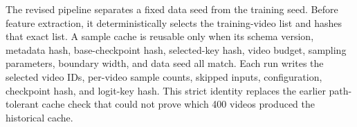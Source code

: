 The revised pipeline separates a fixed data seed from the training seed.
Before feature extraction, it deterministically selects the training-video
list and hashes that exact list. A sample cache is reusable only when its schema
version, metadata hash, base-checkpoint hash, selected-key hash, video budget,
sampling parameters, boundary width, and data seed all match. Each run writes
the selected video IDs, per-video sample counts, skipped inputs, configuration,
checkpoint hash, and logit-key hash. This strict identity replaces the earlier
path-tolerant cache check that could not prove which 400 videos produced the
historical cache.

